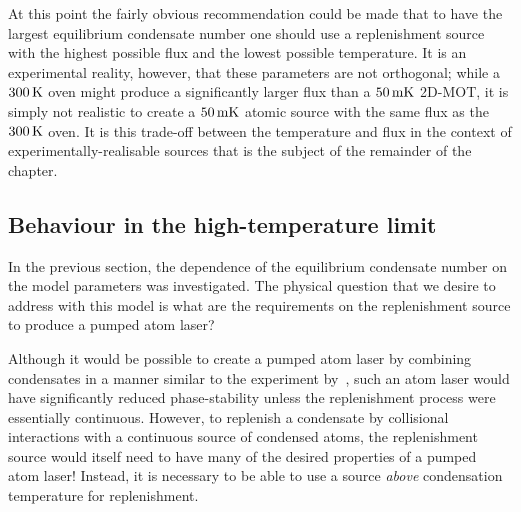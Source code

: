 At this point the fairly obvious recommendation could be made that to have the largest equilibrium condensate number one should use a replenishment source with the highest possible flux and the lowest possible temperature.  It is an experimental reality, however, that these parameters are not orthogonal; while a $\unit[300]{K}$ oven might produce a significantly larger flux than a $\unit[50]{mK}$ 2D-MOT, it is simply not realistic to create a $\unit[50]{mK}$ atomic source with the same flux as the $\unit[300]{K}$ oven.  It is this trade-off between the temperature and flux in the context of experimentally-realisable sources that is the subject of the remainder of the chapter.




\subsection{Behaviour in the high-temperature limit}
\label{KineticTheory:HighTemperatureLimit}
In the previous section, the dependence of the equilibrium condensate number on the model parameters was investigated. The physical question that we desire to address with this model is what are the requirements on the replenishment source to produce a pumped atom laser?

Although it would be possible to create a pumped atom laser by combining condensates in a manner similar to the experiment by~\citet{Chikkatur:2002qa}, such an atom laser would have significantly reduced phase-stability unless the replenishment process were essentially continuous. However, to replenish a condensate by collisional interactions with a continuous source of condensed atoms, the replenishment source would itself need to have many of the desired properties of a pumped atom laser! Instead, it is necessary to be able to use a source \emph{above} condensation temperature for replenishment.

